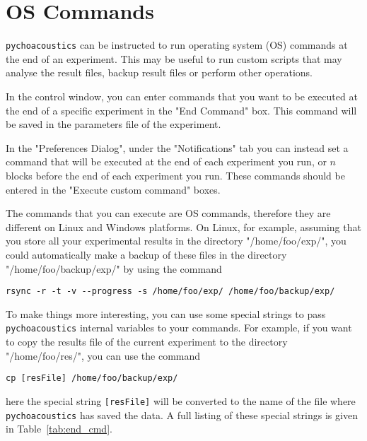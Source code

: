 \section{OS Commands}
\label{sec:end_cmd}

\texttt{pychoacoustics} can be instructed to run operating system (OS) commands
at the end of an experiment. This may be useful to run custom scripts that may
analyse the result files, backup result files or perform other operations. 

In the control window, you can enter commands that you want to be executed at the
end of a specific experiment in the "End Command" box. This command will be saved
in the parameters file of the experiment.

In the "Preferences Dialog", under the "Notifications" tab you can instead set a command
that will be executed at the end of each experiment you run, or $n$ blocks before the end of each experiment you run. 
These commands should be entered in the "Execute custom command" boxes.

The commands that you can execute are OS commands, therefore they are different on Linux
and Windows platforms. On Linux, for example, assuming that you store all your experimental
results in the directory "/home/foo/exp/", you could automatically make a backup of these
files in the directory "/home/foo/backup/exp/" by using the command
\begin{verbatim}
rsync -r -t -v --progress -s /home/foo/exp/ /home/foo/backup/exp/
\end{verbatim}

To make things more interesting, you can use some special strings to pass \texttt{pychoacoustics}
internal variables to your commands. For example, if you want to copy the results file of
the current experiment to the directory "/home/foo/res/", you can use the command
\begin{verbatim}
cp [resFile] /home/foo/backup/exp/
\end{verbatim}
here the special string \verb+[resFile]+ will be converted to the name of the file where \texttt{pychoacoustics}
has saved the data. A full listing of these special strings is given in Table~\ref{tab:end_cmd}.

